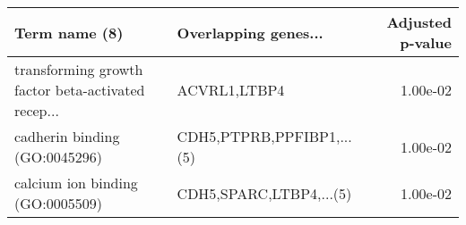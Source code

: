 \begin{tabular}{llr}
\toprule
                                     Term name (8) &      Overlapping genes... &  Adjusted p-value \\
\midrule
transforming growth factor beta-activated recep... &              ACVRL1,LTBP4 &          1.00e-02 \\
                     cadherin binding (GO:0045296) & CDH5,PTPRB,PPFIBP1,...(5) &          1.00e-02 \\
                  calcium ion binding (GO:0005509) &   CDH5,SPARC,LTBP4,...(5) &          1.00e-02 \\
\bottomrule
\end{tabular}
